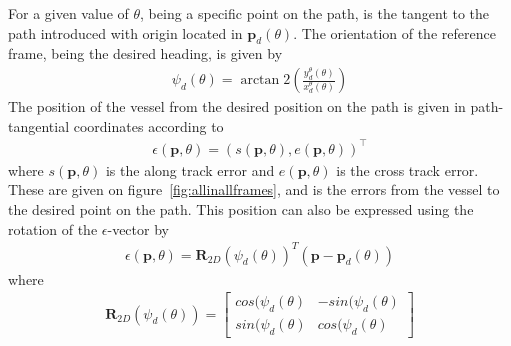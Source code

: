 For a given value of $\theta$, being a specific point on the path, is the tangent to the path introduced with origin located in $\textbf{p}_d(\theta)$. The orientation of the reference frame, being the desired heading, is given by
\begin{align}
\psi_d(\theta) = \arctan2\left(\frac{y_d^\theta(\theta)}{x_d^\theta(\theta)}\right)
\end{align}
The position of the vessel from the desired position on the path is given in path-tangential coordinates according to
\begin{align}
\epsilon(\textbf{p},\theta) = (s(\textbf{p},\theta),e(\textbf{p},\theta))^\top
\end{align}
where $s(\textbf{p},\theta)$ is the along track error and $e(\textbf{p},\theta)$ is the cross track error. These are given on figure~\vref{fig:allinallframes}, and is the errors from the vessel to the desired point on the path. This position can also be expressed using the rotation of the $\epsilon$-vector by
\begin{align}
\epsilon(\textbf{p},\theta) = \textbf{R}_{2D}(\psi_d(\theta))^T(\textbf{p}-\textbf{p}_d(\theta))
\end{align}
where
\begin{align}
\textbf{R}_{2D}(\psi_d(\theta)) = 
\begin{bmatrix}
cos(\psi_d(\theta) & -sin(\psi_d(\theta)\\
sin(\psi_d(\theta) & cos(\psi_d(\theta)
\end{bmatrix}
\end{align}
